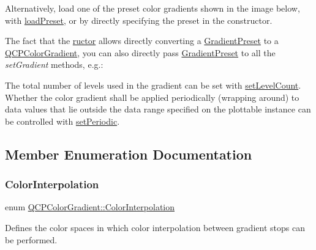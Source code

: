 Alternatively, load one of the preset color gradients shown in the image below, with \hyperlink{class_q_c_p_color_gradient_aa0aeec1528241728b9671bf8e60b1622}{load\+Preset}, or by directly specifying the preset in the constructor.



The fact that the \hyperlink{class_q_c_p_color_gradient}{ructor} allows directly converting a \hyperlink{class_q_c_p_color_gradient_aed6569828fee337023670272910c9072}{Gradient\+Preset} to a \hyperlink{class_q_c_p_color_gradient}{Q\+C\+P\+Color\+Gradient}, you can also directly pass \hyperlink{class_q_c_p_color_gradient_aed6569828fee337023670272910c9072}{Gradient\+Preset} to all the {\itshape set\+Gradient} methods, e.\+g.\+: 
\begin{DoxyCodeInclude}
\end{DoxyCodeInclude}
 The total number of levels used in the gradient can be set with \hyperlink{class_q_c_p_color_gradient_a18da587eb4f7fc788ea28ba15b6a12de}{set\+Level\+Count}. Whether the color gradient shall be applied periodically (wrapping around) to data values that lie outside the data range specified on the plottable instance can be controlled with \hyperlink{class_q_c_p_color_gradient_a39d6448155fc00a219f239220d14bb39}{set\+Periodic}. 

\subsection{Member Enumeration Documentation}
\hypertarget{class_q_c_p_color_gradient_ac5dca17cc24336e6ca176610e7f77fc1}{}\label{class_q_c_p_color_gradient_ac5dca17cc24336e6ca176610e7f77fc1} 
\subsubsection{\texorpdfstring{Color\+Interpolation}{ColorInterpolation}}
{\footnotesize\ttfamily enum \hyperlink{class_q_c_p_color_gradient_ac5dca17cc24336e6ca176610e7f77fc1}{Q\+C\+P\+Color\+Gradient\+::\+Color\+Interpolation}}

Defines the color spaces in which color interpolation between gradient stops can be performed.

